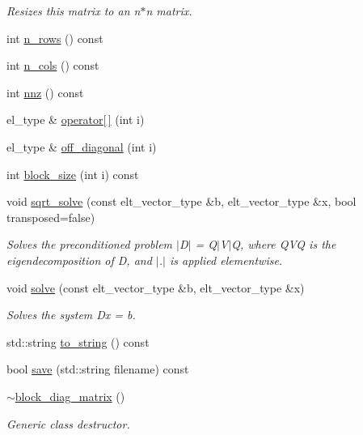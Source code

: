 \begin{DoxyCompactItemize}
\begin{DoxyCompactList}\small\item\em Resizes this matrix to an n$\ast$n matrix. \end{DoxyCompactList}\item 
int \hyperlink{classblock__diag__matrix_a7d965a63398622c241a1b28b41cd9d18}{n\+\_\+rows} () const 
\item 
int \hyperlink{classblock__diag__matrix_a09c9b0481acb773a864fa9f320f76cc7}{n\+\_\+cols} () const 
\item 
int \hyperlink{classblock__diag__matrix_a7119c39d6ffdf74c2e995d9ae53f57a2}{nnz} () const 
\item 
el\+\_\+type \& \hyperlink{classblock__diag__matrix_a82f0f2e27c91802823c80b1c8007df4d}{operator\mbox{[}$\,$\mbox{]}} (int i)
\item 
el\+\_\+type \& \hyperlink{classblock__diag__matrix_aa57572352da969e948428ad7521a1ce3}{off\+\_\+diagonal} (int i)
\item 
int \hyperlink{classblock__diag__matrix_ad2a00befe5b5c5718e222fa99cbbefd2}{block\+\_\+size} (int i) const 
\item 
void \hyperlink{classblock__diag__matrix_a5f75bcd1cafdb778f2658b7677ad97b9}{sqrt\+\_\+solve} (const elt\+\_\+vector\+\_\+type \&b, elt\+\_\+vector\+\_\+type \&x, bool transposed=false)
\begin{DoxyCompactList}\small\item\em Solves the preconditioned problem $\vert$\+D$\vert$ = Q$\vert$\+V$\vert$Q\textquotesingle{}, where Q\+VQ\textquotesingle{} is the eigendecomposition of D, and $\vert$.$\vert$ is applied elementwise. \end{DoxyCompactList}\item 
void \hyperlink{classblock__diag__matrix_a9cc0b7bc0f96b6688edaef61be790430}{solve} (const elt\+\_\+vector\+\_\+type \&b, elt\+\_\+vector\+\_\+type \&x)
\begin{DoxyCompactList}\small\item\em Solves the system Dx = b. \end{DoxyCompactList}\item 
std\+::string \hyperlink{classblock__diag__matrix_a8aa70dbd0e2c29d814fe5c29701b84cc}{to\+\_\+string} () const 
\item 
bool \hyperlink{classblock__diag__matrix_aa6b66605d7e4af701ec12effaa1f0637}{save} (std\+::string filename) const 
\item 
\hyperlink{classblock__diag__matrix_a060d90add0a7490196fd47f5efb1c818}{$\sim$block\+\_\+diag\+\_\+matrix} ()\hypertarget{classblock__diag__matrix_a060d90add0a7490196fd47f5efb1c818}{}\label{classblock__diag__matrix_a060d90add0a7490196fd47f5efb1c818}

\begin{DoxyCompactList}\small\item\em Generic class destructor. \end{DoxyCompactList}\end{DoxyCompactItemize}
